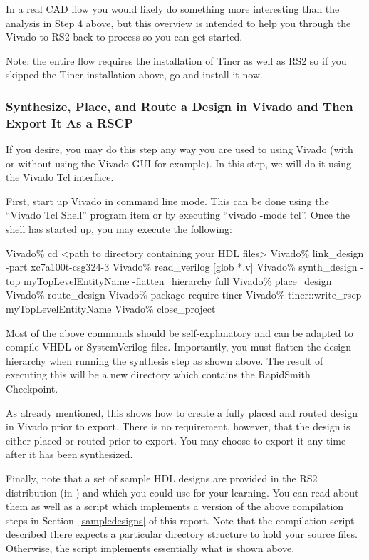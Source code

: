 In a real CAD flow you would likely do something more interesting
than the analysis in Step 4 above, but this overview is intended to help you
through the Vivado-to-RS2-back-to process so you can get started.

Note: the entire flow requires the installation of Tincr as well as RS2 so if
you skipped the Tincr installation above, go and install it now.

\subsubsection{Synthesize, Place, and Route a Design in Vivado and Then Export
It As a RSCP} If you desire, you may do this step any way you are used to using
Vivado (with or without using the Vivado GUI for example).  In this step, we
will do it using the Vivado Tcl interface.

First, start up Vivado in command line mode.  This can be done using the
``Vivado Tcl Shell'' program item or by executing ``vivado -mode tcl''.  Once
the shell has started up, you may execute the following:
                
\vspace{-0.15in}  \begin{code}
	Vivado\% cd <path to directory containing your HDL files>
	Vivado\% link_design -part xc7a100t-csg324-3
	Vivado\% read_verilog [glob *.v]
	Vivado\% synth_design -top myTopLevelEntityName -flatten_hierarchy full 
	Vivado\% place_design
	Vivado\% route_design
	Vivado\% package require tincr
	Vivado\% tincr::write_rscp myTopLevelEntityName
	Vivado\% close_project
\end{code}
Most of the above commands should be self-explanatory and can be adapted to
compile VHDL or SystemVerilog files.
Importantly,  you must flatten the design hierarchy when running
the synthesis step as shown above.  The result of executing this will be a new
directory which contains the RapidSmith Checkpoint.

As already mentioned, this shows how to create a fully placed and routed design
in Vivado prior to export.  There is no requirement, however, that the design is
either placed or routed prior to export.  You may choose to export it any time
after it has been synthesized.

Finally, note that a set of sample HDL designs are provided in the RS2
distribution (in ) and which you could use for your
learning.
You can read about them as well as a script which implements a version of the
above compilation steps in Section~\ref{sampledesigns} of this report.  Note
that the compilation script described there expects a particular directory
structure to hold your source files.  Otherwise, the script implements 
essentially what is shown above.

